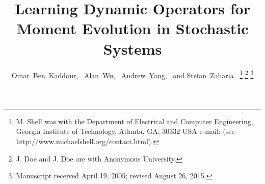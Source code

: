 \documentclass[journal, onecolumn]{IEEEtran}
\begin{document}
%
\title{Learning Dynamic Operators for Moment Evolution in Stochastic Systems}

%
%
%

\author{Omar~Ben~Kaddour,~\IEEEmembership{}
        Alan~Wu,~\IEEEmembership{}
        Andrew~Yang,~\IEEEmembership{}
        and Stefan~Zaharia~\IEEEmembership{}%
\thanks{M. Shell was with the Department
of Electrical and Computer Engineering, Georgia Institute of Technology, Atlanta,
GA, 30332 USA e-mail: (see http://www.michaelshell.org/contact.html).}%
\thanks{J. Doe and J. Doe are with Anonymous University.}%
\thanks{Manuscript received April 19, 2005; revised August 26, 2015.}}

% 
%
\end{document}
